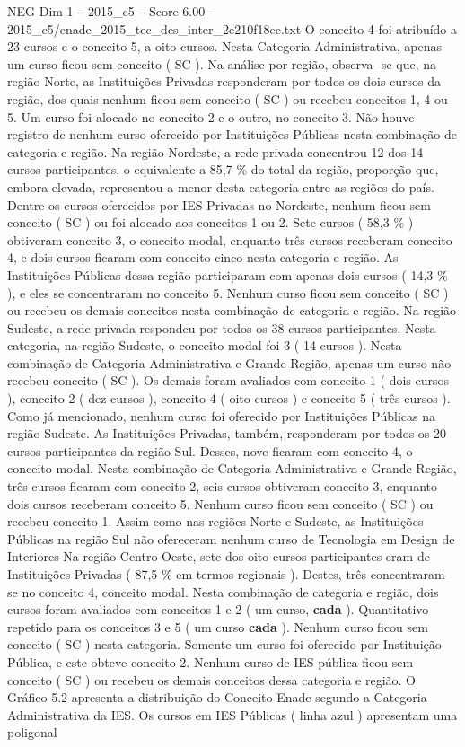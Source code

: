 \begin{textsample}{NEG Dim 1 – 2015\_c5 – Score 6.00 – 2015\_c5/enade\_2015\_tec\_des\_inter\_2e210f18ec.txt}
O conceito 4 foi atribuído a 23 cursos e o conceito 5, a oito cursos.
Nesta Categoria Administrativa, apenas um curso ficou sem conceito ( SC ).
Na análise por região, observa -se que, na região Norte, as Instituições Privadas responderam por todos os dois cursos da região, dos quais nenhum ficou sem conceito ( SC ) ou recebeu conceitos 1, 4 ou 5.
Um curso foi alocado no conceito 2 e o outro, no conceito 3.
Não houve registro de nenhum curso oferecido por Instituições Públicas nesta combinação de categoria e região.
Na região Nordeste, a rede privada concentrou 12 dos 14 cursos participantes, o equivalente a 85,7 \% do total da região, proporção que, embora elevada, representou a menor desta categoria entre as regiões do país.
Dentre os cursos oferecidos por IES Privadas no Nordeste, nenhum ficou sem conceito ( SC ) ou foi alocado aos conceitos 1 ou 2.
Sete cursos ( 58,3 \% ) obtiveram conceito 3, o conceito modal, enquanto três cursos receberam conceito 4, e dois cursos ficaram com conceito cinco nesta categoria e região.
As Instituições Públicas dessa região participaram com apenas dois cursos ( 14,3 \% ), e eles se concentraram no conceito 5.
Nenhum curso ficou sem conceito ( SC ) ou recebeu os demais conceitos nesta combinação de categoria e região.
Na região Sudeste, a rede privada respondeu por todos os 38 cursos participantes.
Nesta categoria, na região Sudeste, o conceito modal foi 3 ( 14 cursos ).
Nesta combinação de Categoria Administrativa e Grande Região, apenas um curso não recebeu conceito ( SC ).
Os demais foram avaliados com conceito 1 ( dois cursos ), conceito 2 ( dez cursos ), conceito 4 ( oito cursos ) e conceito 5 ( três cursos ).
Como já mencionado, nenhum curso foi oferecido por Instituições Públicas na região Sudeste.
As Instituições Privadas, também, responderam por todos os 20 cursos participantes da região Sul.
Desses, nove ficaram com conceito 4, o conceito modal.
Nesta combinação de Categoria Administrativa e Grande Região, três cursos ficaram com conceito 2, seis cursos obtiveram conceito 3, enquanto dois cursos receberam conceito 5.
Nenhum curso ficou sem conceito ( SC ) ou recebeu conceito 1.
Assim como nas regiões Norte e Sudeste, as Instituições Públicas na região Sul não ofereceram nenhum curso de Tecnologia em Design de Interiores Na região Centro-Oeste, sete dos oito cursos participantes eram de Instituições Privadas ( 87,5 \% em termos regionais ).
Destes, três concentraram -se no conceito 4, conceito modal.
Nesta combinação de categoria e região, dois cursos foram avaliados com conceitos 1 e 2 ( um curso, \textbf{cada} ).
Quantitativo repetido para os conceitos 3 e 5 ( um curso \textbf{cada} ).
Nenhum curso ficou sem conceito ( SC ) nesta categoria.
Somente um curso foi oferecido por Instituição Pública, e este obteve conceito 2.
Nenhum curso de IES pública ficou sem conceito ( SC ) ou recebeu os demais conceitos dessa categoria e região.
O Gráfico 5.2 apresenta a distribuição do Conceito Enade segundo a Categoria Administrativa da IES.
Os cursos em IES Públicas ( linha azul ) apresentam uma poligonal

\end{textsample}
